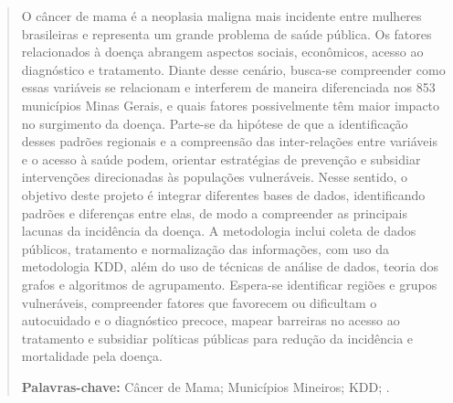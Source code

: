 \begin{abstract}
O câncer de mama é a neoplasia maligna mais incidente entre mulheres brasileiras e representa um grande problema de saúde pública. Os fatores relacionados à doença abrangem aspectos sociais, econômicos, acesso ao diagnóstico e tratamento. Diante desse cenário, busca-se compreender como essas variáveis se relacionam e interferem de maneira diferenciada nos 853 municípios Minas Gerais, e quais fatores possivelmente têm maior impacto no surgimento da doença. Parte-se da hipótese de que a identificação desses padrões regionais e a compreensão das inter-relações entre variáveis e o acesso à saúde podem, orientar estratégias de prevenção e subsidiar intervenções direcionadas às populações vulneráveis. Nesse sentido, o objetivo deste projeto é integrar diferentes bases de dados, identificando padrões e diferenças entre elas, de modo a compreender as principais lacunas da incidência da doença. A metodologia inclui coleta de dados públicos, tratamento e normalização das informações, com uso da metodologia KDD, além do uso de técnicas de análise de dados, teoria dos grafos e algoritmos de agrupamento. Espera-se identificar regiões e grupos vulneráveis, compreender fatores que favorecem ou dificultam o autocuidado e o diagnóstico precoce, mapear barreiras no acesso ao tratamento e subsidiar políticas públicas para redução da incidência e mortalidade pela doença.

\par\medskip

\textbf{Palavras-chave:} Câncer de Mama; Municípios Mineiros; KDD; .

\end{abstract}


